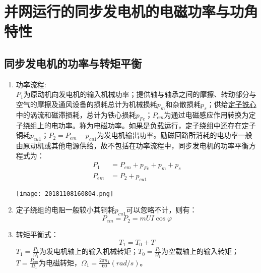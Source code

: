 \documentclass[blue]{elegantnote}
\begin{document}
\section{并网运行的同步发电机的电磁功率与功角特性}
\subsection{同步发电机的功率与转矩平衡}
\begin{enumerate}
	\item 功率流程:\\
		$P_1$为原动机向发电机的输入机械功率；提供轴与轴承之间的摩擦、转动部分与空气的摩擦及通风设备的损耗总计为机械损耗$p_m$和杂散损耗$p_s$；供给{\color{red}\underline{定子铁心}中的涡流和磁滞损耗}，总计为{\color{red}铁心损耗$p_{Fe}$}；$P_{em}$为通过电磁感应作用转换为定子绕组上的电功率。称为电磁功率。如果是负载运行，定子绕组中还存在定子铜耗$p_{cu1}$；$P_2=P_{em}-p_{cu1}$为发电机输出功率。励磁回路所消耗的电功率一般由原动机或其他电源供给，故不包括在功率流程中，同步发电机的功率平衡方程式为：
		\begin{displaymath}
			\begin{aligned}
				P_{1\phantom{b1}} &= P_{em}+p_{Fe}+p_m+p_s\\
				P_{em} &= P_2+p_{cu1}
			\end{aligned}
		\end{displaymath}
		\begin{center}  
			\texttt{[image: 20181108160804.png]}
		\end{center}  
	\item 定子绕组的电阻一般较小其铜耗$p_{cu1}$可以忽略不计，则有：
	$$P_{em}=P_2=mUI\cos\varphi$$
	\item 转矩平衡式：
	$$T_1=T_0+T$$
	$T_1=\frac{P_1}{\Omega_1}$为发电机轴上的输入机械转矩；$T_0=\frac{P_0}{\Omega_1}$为空载轴上的输入转矩；$T=\frac{P_{em}}{\Omega_1}$为电磁转矩，$\Omega_1=\frac{2\pi n_1}{60}(rad/s)$。
\end{enumerate}
\end{document}

